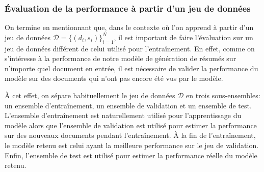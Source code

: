 \subsubsection*{Évaluation de la performance à partir d'un jeu de données}

On termine en mentionnant que, dans le contexte où l'on apprend à partir 
d'un jeu de données $\mathcal{D}=\{(d_i, s_i)\}_{i=1}^N$, il est important 
de faire l'évaluation sur un jeu de données différent de celui utilisé pour l'entraînement.
En effet, comme on s'intéresse à la performance de notre modèle de génération 
de résumés sur n'importe quel document en entrée, il est nécessaire de valider 
la performance du modèle sur des documents qui n'ont pas encore été vus par 
le modèle.

À cet effet, on sépare habituellement le jeu de données $\mathcal{D}$ en trois
sous-ensembles: un ensemble d'entraînement, un ensemble de validation et un ensemble 
de test.
L'ensemble d'entraînement est naturellement utilisé pour l'apprentissage du modèle
alors que l'ensemble de validation est utilisé pour estimer la performance 
sur des nouveaux documents pendant l'entraînement.
À la fin de l'entraînement, le modèle retenu est celui ayant la meilleure performance 
sur le jeu de validation.
Enfin, l'ensemble de test est utilisé pour estimer la performance réelle 
du modèle retenu. 
